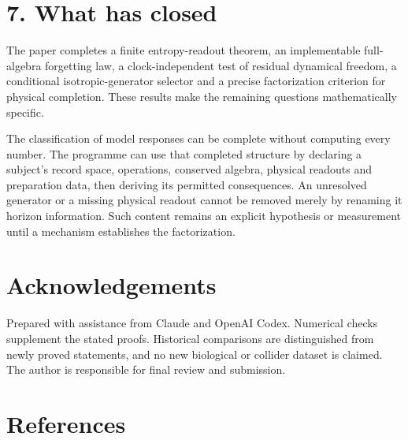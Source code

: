 \documentclass[
  11pt,
  a4paper,
]{article}
\begin{document}
\section{7. What has closed}\label{what-has-closed}

The paper completes a finite entropy-readout theorem, an implementable full-algebra forgetting law, a clock-independent test of residual dynamical freedom, a conditional isotropic-generator selector and a precise factorization criterion for physical completion. These results make the remaining questions mathematically specific.

The classification of model responses can be complete without computing every number. The programme can use that completed structure by declaring a subject's record space, operations, conserved algebra, physical readouts and preparation data, then deriving its permitted consequences. An unresolved generator or a missing physical readout cannot be removed merely by renaming it horizon information. Such content remains an explicit hypothesis or measurement until a mechanism establishes the factorization.

\section{Acknowledgements}\label{acknowledgements}

Prepared with assistance from Claude and OpenAI Codex. Numerical checks supplement the stated proofs. Historical comparisons are distinguished from newly proved statements, and no new biological or collider dataset is claimed. The author is responsible for final review and submission.

\section{References}\label{references}
\end{document}
